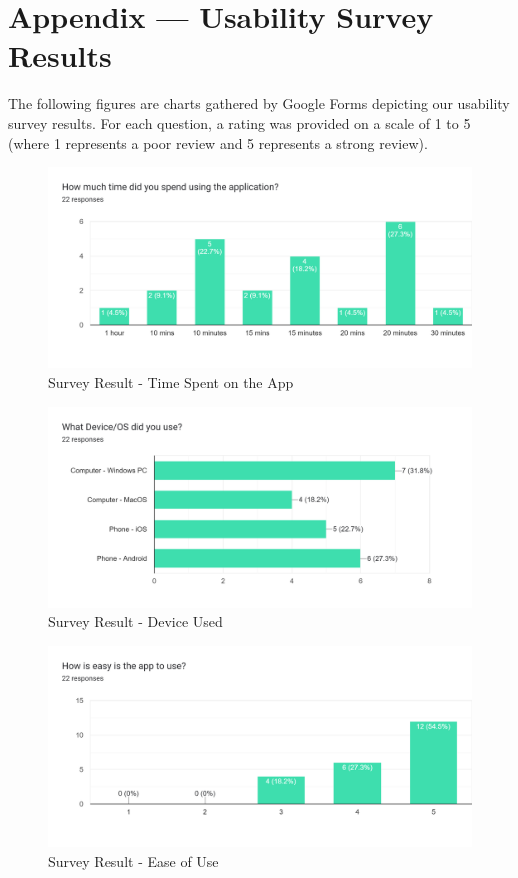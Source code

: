 \documentclass[12pt, titlepage]{article}
\begin{document}
\section*{Appendix --- Usability Survey Results}
\label{sec:AppSurveyResults}
The following figures are charts gathered by Google Forms depicting our usability survey results. For each question, a rating was provided on a scale of 1 to 5 (where 1 represents a poor review and 5 represents a strong review).
\begin{figure}[!h]
    \centering
    \includegraphics[width=\textwidth]{time_spent.jpg}
    \caption{Survey Result - Time Spent on the App}
    \label{fig:time_spent}
\end{figure}
\begin{figure}[!h]
    \centering
    \includegraphics[width=\textwidth]{device_used.jpg}
    \caption{Survey Result - Device Used}
    \label{fig:device_used}
\end{figure}
\begin{figure}[!h]
    \centering
    \includegraphics[width=\textwidth]{ease_of_use.jpg}
    \caption{Survey Result - Ease of Use}
    \label{fig:ease_of_use}
\end{figure}
\end{document}
